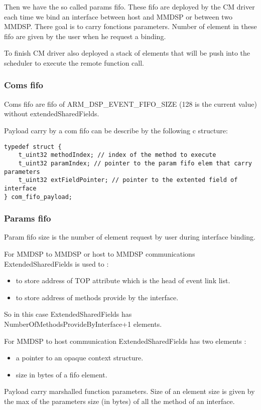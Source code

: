 Then we have the so called params fifo. These fifo are deployed by the CM driver
each time we bind an interface between host and MMDSP or between two MMDSP.
There goal is to carry fonctions parameters. Number of element in these fifo are
given by the user when he request a binding.

To finish CM driver also deployed a stack of elements that will be push into the
scheduler to execute the remote function call.
\subsubsection{Coms fifo}
Coms fifo are fifo of ARM\_DSP\_EVENT\_FIFO\_SIZE (128 is the current value)
without extendedSharedFields.

Payload carry by a com fifo can be describe by the following c structure:
\begin{lstlisting}[caption=com fifo payload description, label=comPayload]
typedef struct {
    t_uint32 methodIndex; // index of the method to execute
    t_uint32 paramIndex; // pointer to the param fifo elem that carry parameters
    t_uint32 extFieldPointer; // pointer to the extented field of interface
} com_fifo_payload;
\end{lstlisting}

\subsubsection{Params fifo}
Param fifo size is the number of element request by user during interface
binding.

For MMDSP to MMDSP or host to MMDSP communications ExtendedSharedFields is used
to :
\begin{itemize}
  \item to store address of TOP attribute which is the head of event link list.
  \item to store address of methods provide by the interface.
\end{itemize}
So in this case ExtendedSharedFields has NumberOfMethodsProvideByInterface+1
elements.

For MMDSP to host communication ExtendedSharedFields has two elements :
\begin{itemize}
  \item a pointer to an opaque context structure.
  \item size in bytes of a fifo element.
\end{itemize}

Payload carry marshalled function parameters. Size of an element size is given
by the max of the parameters size (in bytes) of all the method of an interface.

